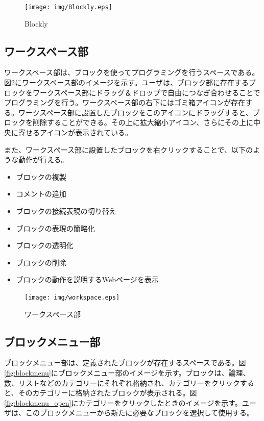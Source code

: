 \documentclass{eniepaper}
\begin{document}
\begin{figure}[h]
\begin{center}
\texttt{[image: img/Blockly.eps]}
\caption{Blockly}%
\label{fig:Blockly}
\end{center}%
\end{figure}%

   \subsection{ワークスペース部}

ワークスペース部は、ブロックを使ってプログラミングを行うスペースである。図\ref{fig:workspace}にワークスペース部のイメージを示す。ユーザは、ブロック部に存在するブロックをワークスペース部にドラッグ＆ドロップで自由につなぎ合わせることでプログラミングを行う。ワークスペース部の右下にはゴミ箱アイコンが存在する。ワークスペース部に設置したブロックをこのアイコンにドラッグすると、ブロックを削除することができる。その上に拡大縮小アイコン、さらにその上に中央に寄せるアイコンが表示されている。

また、ワークスペース部に設置したブロックを右クリックすることで、以下のような動作が行える。

\begin{itemize}
\item ブロックの複製
\item コメントの追加
\item ブロックの接続表現の切り替え
\item ブロックの表現の簡略化
\item ブロックの透明化
\item ブロックの削除
\item ブロックの動作を説明するWebページを表示
\end{itemize} 
   
\begin{figure}[h]
\begin{center}
\texttt{[image: img/workspace.eps]}
\caption{ワークスペース部}%
\label{fig:workspace}
\end{center}%
\end{figure}%

   \subsection{ブロックメニュー部}
   
ブロックメニュー部は、定義されたブロックが存在するスペースである。図\ref{fig:blockmenu}にブロックメニュー部のイメージを示す。ブロックは、論理、数、リストなどのカテゴリーにそれぞれ格納され、カテゴリーをクリックすると、そのカテゴリーに格納されたブロックが表示される。図\ref{fig:blockmenu_open}にカテゴリーをクリックしたときのイメージを示す。ユーザは、このブロックメニューから新たに必要なブロックを選択して使用する。
\end{document}
